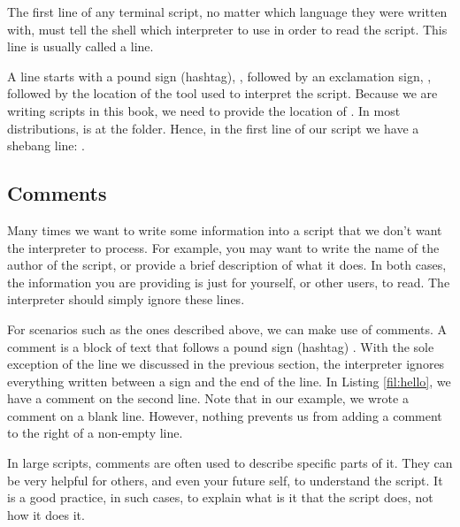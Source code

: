 The first line of any terminal script, no matter which language they were written with, must tell the shell which interpreter to use in order to read the script. This line is usually called a  line.

A  line starts with a pound sign (hashtag), \mycommand{\#}, followed by an exclamation sign, \mycommand{!}, followed by the location of the tool used to interpret the script. Because we are writing  scripts in this book, we need to provide the location of . In most distributions,  is at the  folder. Hence, in the first line of our script we have a shebang line: .

\subsection{Comments}

Many times we want to write some information into a script that we don't want the interpreter to process. For example, you may want to write the name of the author of the script, or provide a brief description of what it does. In both cases, the information you are providing is just for yourself, or other users, to read. The interpreter should simply ignore these lines.

For scenarios such as the ones described above, we can make use of comments. A comment is a block of text that follows a pound sign (hashtag) \mycommand{\#}. With the sole exception of the  line we discussed in the previous section, the interpreter ignores everything written between a \mycommand{\#} sign and the end of the line. In Listing \ref{fil:hello}, we have a comment on the second line. Note that in our example, we wrote a comment on a blank line. However, nothing prevents us from adding a comment to the right of a non-empty line.

In large scripts, comments are often used to describe specific parts of it. They can be very helpful for others, and even your future self, to understand the script. It is a good practice, in such cases, to explain what is it that the script does, not how it does it.

\subsection{}

